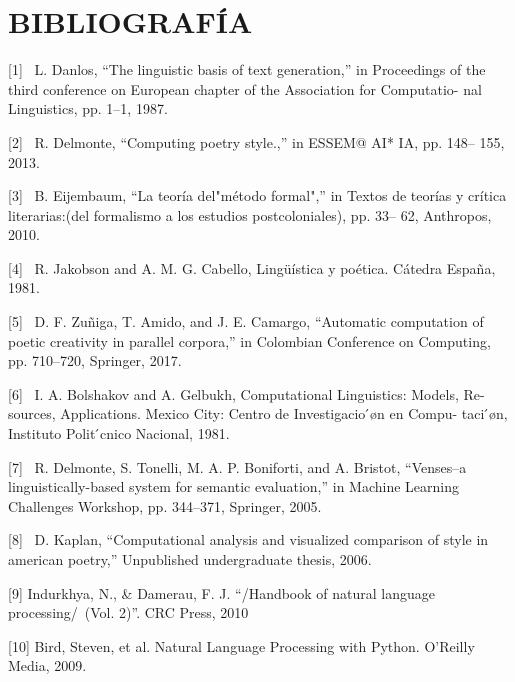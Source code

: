 \documentclass[twoside]{article}
\begin{document}
\section{BIBLIOGRAFÍA}
\label{sec:orgd9c43f5}

[1]  L. Danlos, “The linguistic basis of text generation,” in
Proceedings of the third conference on European chapter of the
Association for Computatio- nal Linguistics, pp. 1--1, 1987.

[2]  R. Delmonte, “Computing poetry style.,” in ESSEM@ AI* IA, pp. 148--
155, 2013.

[3]  B. Eijembaum, “La teoría del"método formal",” in Textos de teorías
y crítica literarias:(del formalismo a los estudios postcoloniales), pp.
33-- 62, Anthropos, 2010.

[4]  R. Jakobson and A. M. G. Cabello, Lingüística y poética. Cátedra
España, 1981.

[5]  D. F. Zuñiga, T. Amido, and J. E. Camargo, “Automatic computation
of poetic creativity in parallel corpora,” in Colombian Conference on
Computing, pp. 710--720, Springer, 2017.

[6]  I. A. Bolshakov and A. Gelbukh, Computational Linguistics: Models,
Re- sources, Applications. Mexico City: Centro de Investigacio ́øn en
Compu- taci ́øn, Instituto Polit ́cnico Nacional, 1981.

[7]  R. Delmonte, S. Tonelli, M. A. P. Boniforti, and A. Bristot,
“Venses--a linguistically-based system for semantic evaluation,” in
Machine Learning Challenges Workshop, pp. 344--371, Springer, 2005.

[8]  D. Kaplan, “Computational analysis and visualized comparison of
style in american poetry,” Unpublished undergraduate thesis, 2006.

[9] Indurkhya, N., \& Damerau, F. J. “/Handbook of natural language
processing/ (Vol. 2)”. CRC Press, 2010


[10] Bird, Steven, et al. Natural Language Processing with Python.
O'Reilly Media, 2009.




\end{document}
